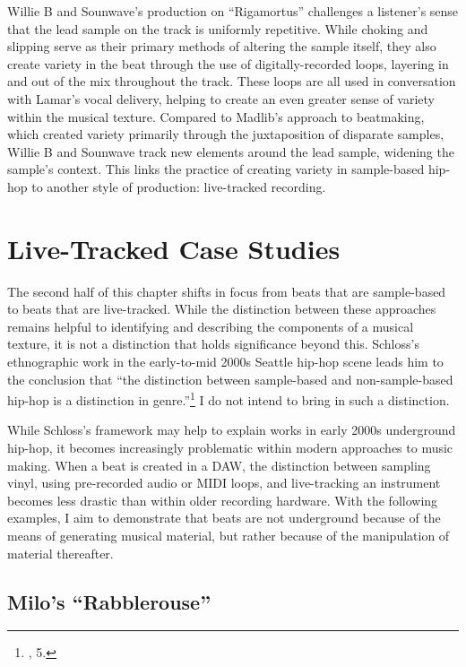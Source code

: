 Willie B and Sounwave's production on ``Rigamortus'' challenges a listener's sense that the lead 
sample on the track is uniformly repetitive. While choking and slipping serve as their primary methods
of altering the sample itself, they also create variety in the beat through the use of digitally-recorded
loops, layering in and out of the mix throughout the track. These loops are all used in conversation 
with Lamar's vocal delivery, helping to create an even greater sense of variety within the musical 
texture. Compared to Madlib's approach to beatmaking, which created variety primarily through the
juxtaposition of disparate samples, Willie B and Sounwave track new elements around the lead sample, 
widening the sample's context. This links the practice of creating variety in sample-based hip-hop 
to another style of production: live-tracked recording.

\section{Live-Tracked Case Studies}
The second half of this chapter shifts in focus from beats that are sample-based to beats that are
live-tracked. While the distinction between these approaches remains helpful to identifying and describing
the components of a musical texture, it is not a distinction that holds significance beyond this. 
Schloss's ethnographic work in the early-to-mid 2000s Seattle hip-hop scene leads him to the conclusion
that ``the distinction between sample-based and non-sample-based hip-hop is a distinction in
genre.''\footnote{\cite{josephgschlossMakingBeatsArt2004}, 5.} I do not intend to bring in 
such a distinction.

While Schloss's framework may help to explain works in early 2000s underground hip-hop, it becomes
increasingly problematic within modern approaches to music making. When a beat is created in a DAW, 
the distinction between sampling vinyl, using pre-recorded audio or MIDI loops, and live-tracking an
instrument becomes less drastic than within older recording hardware. With the following examples, I aim
to demonstrate that beats are not underground because of the means of generating musical material, but 
rather because of the manipulation of material thereafter.

\subsection*{\centering Milo's ``Rabblerouse''}

